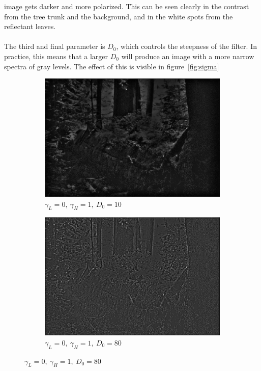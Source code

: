 		image gets darker and more polarized. This can be seen clearly in the contrast from the
		tree trunk and the background, and in the white spots from the reflectant leaves.
		\\
		\\
		The third and final parameter is $D_0$, which controls the steepness of the filter.
		In practice, this means that a larger $D_0$ will produce an image with a more 
		narrow spectra of gray levels. The effect of this is visible in figure~\ref{fig:sigma}
		\begin{figure}[h!]
			\centering
			\begin{subfigure}[b]{0.5\linewidth}
				\includegraphics[width=0.9\linewidth]{pics/low_sigma.png}
				\caption{$\gamma_L = 0,~\gamma_H = 1,~D_0 = 10$}
				\label{fig:low_sigma}
			\end{subfigure}%
			\begin{subfigure}[b]{0.5\linewidth}
				\includegraphics[width=0.9\linewidth]{pics/high_sigma.png}
				\caption{$\gamma_L = 0,~\gamma_H = 1,~D_0 =80$}

\end{subfigure}
\end{figure}
